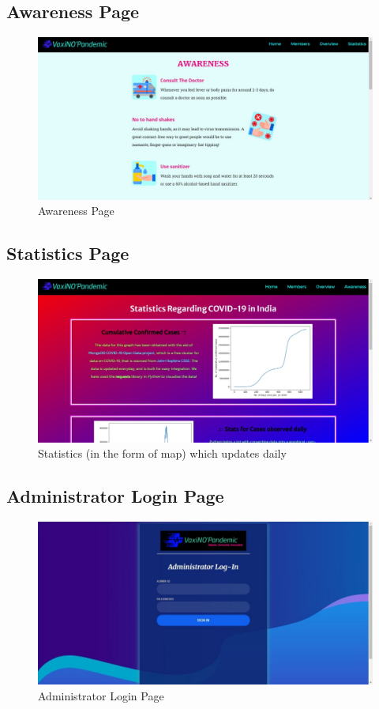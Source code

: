 \documentclass{article}
\begin{document}
    \subsection{Awareness Page}
        \begin{figure}[hbt]
            \centering
            \includegraphics[scale=0.3]{awareness.jpeg}
            \caption{Awareness Page}
            \label{fig:awareness}
        \end{figure}
    \newpage
    \subsection{Statistics Page}
        \begin{figure}[hbt]
            \centering
            \includegraphics[scale=0.3]{stats.jpeg}
            \caption{Statistics (in the form of map) which updates daily}
            \label{fig:stats}
        \end{figure}
    \subsection{Administrator Login Page}
        \begin{figure}[hbt]
            \centering
            \includegraphics[scale=0.3]{adminlogin.jpeg}
            \caption{Administrator Login Page}
            \label{fig:adminlogin}
        \end{figure}
    \newpage
\end{document}
